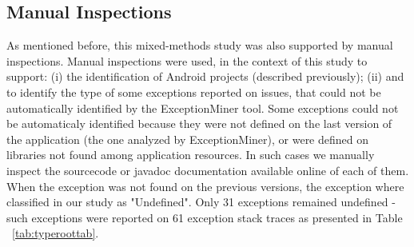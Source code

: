 \documentclass[conference]{IEEEtran}
\begin{document}



\subsection{Manual Inspections}
As mentioned before, this mixed-methods study was also supported by manual inspections. 
Manual inspections were used, in the context of this study to support: (i) the identification of Android projects (described previously);
(ii) and to identify the type of some exceptions reported on issues, that could not be automatically identified by the ExceptionMiner tool.
Some exceptions could not be automaticaly identified because they were 
not defined on the last version of the application (the one analyzed by ExceptionMiner),
or were defined on libraries not found among application resources.
In such cases we manually inspect the sourcecode or javadoc
 documentation available online of each of them. 
When the exception was not found on the previous versions, the exception where classified 
in our study as "Undefined".  Only 31 exceptions 
remained undefined - such exceptions were reported on 61 exception stack traces as 
presented in Table ~\ref{tab:typeroottab}.

\end{document}

